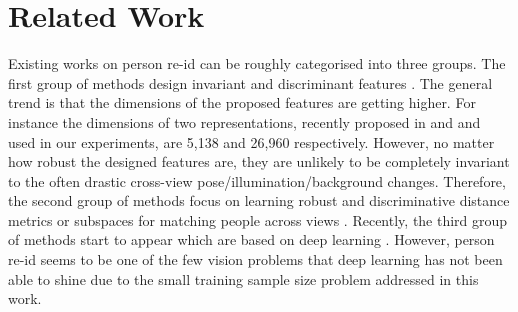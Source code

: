 \documentclass[10pt,twocolumn,letterpaper]{article}
\begin{document}
\section{Related Work}


Existing works on person re-id can be roughly categorised into three groups.
The first group of methods design invariant and discriminant features
\cite{li2014deepreid,Gray_PedestrianRecognitionEnsembleLocalFeature_08a,Farenzena_cvpr10,
  kviatkovsky2013color,ma2012local,zhao2014learning,lisanti2014matching,yang2014salient,liao2015person}.  The general trend is that the dimensions of the proposed features are getting higher. For instance the dimensions of two representations, recently proposed  in \cite{lisanti2014matching} and \cite{liao2015person} and used in our experiments, are 5,138 and 26,960 respectively. However, no matter how robust the designed features are, they are unlikely to be completely invariant to the often drastic cross-view pose/illumination/background changes. Therefore, the second group of methods
focus on learning robust and discriminative distance metrics or subspaces for matching people across views
\cite{Gray_PedestrianRecognitionEnsembleLocalFeature_08a,koestinger2012large,
  Prosser_PerReSVR_10a,Zheng_RDC_2013a,mignon2012pcca,li2013person,pedagadi2013local,
  li2013learning,zhao2013unsupervised,zhao2013person,xiong2014person,ma2014person,lisanti2014matching,lisantiperson,liao2015person,paisitkriangkrailearning}. Recently, the third group of methods start to  appear which are based on deep learning \cite{li2014deepreid,ahmed2015improved}. However, person re-id seems to be one of the few vision problems that deep learning has not been able to shine due to the small training sample size problem addressed in this work.

\end{document}

